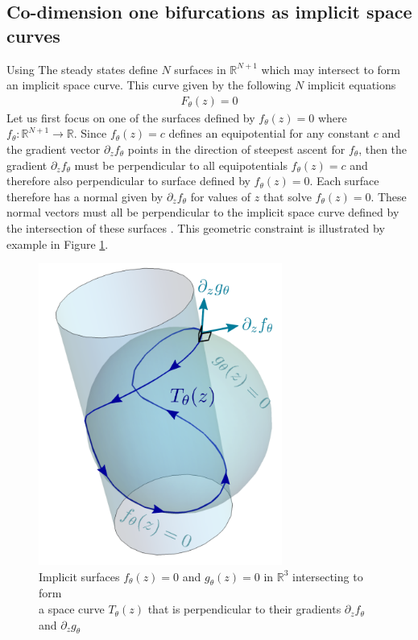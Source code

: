 \documentclass{article}[12pt]
\numberwithin{equation}{section}
\begin{document}
\subsection{Co-dimension one bifurcations as implicit space curves}
Using 
The steady states define $N$ surfaces in $\mathbb{R}^{N+1}$ which may intersect to form an implicit space curve. This curve given by the following $N$ implicit equations
\begin{align}
    F_{\theta}(z) = 0
\end{align}
Let us first focus on one of the surfaces defined by $f_{\theta}(z)=0$ where $f_{\theta} : \mathbb{R}^{N+1}\rightarrow\mathbb{R}$. Since $f_{\theta}(z)=c$ defines an equipotential for any constant $c$ and the gradient vector $\partial_z f_{\theta}$ points in the direction of steepest ascent for $f_{\theta}$, then the gradient $\partial_z f_{\theta}$ must be perpendicular to all equipotentials $f_{\theta}(z)=c$ and therefore also perpendicular to surface defined by $f_{\theta}(z)=0$. Each surface therefore has a normal given by
$\partial_z f_{\theta}$ for values of $z$ that solve $f_{\theta}(z)=0$.
These normal vectors must all be perpendicular to the implicit space curve defined by the intersection of these surfaces \cite{Goldman2005CurvatureSurfaces}. This geometric constraint is illustrated by example in Figure \ref{fig:implicit-surfaces}.

\begin{figure}[H]
\centering{}
\captionsetup{justification=centering}
\includegraphics[width=8cm]{docs/figures/implicit-surfaces}
\caption{Implicit surfaces $f_{\theta}(z)=0$ and $g_{\theta}(z)=0$ in $\mathbb{R}^3$ intersecting to form\\ a space curve $T_{\theta}(z)$ that is perpendicular to their gradients $\partial_{z}f_{\theta}$ and $\partial_{z}g_{\theta}$}
\label{fig:implicit-surfaces}
\end{figure}
\end{document}

